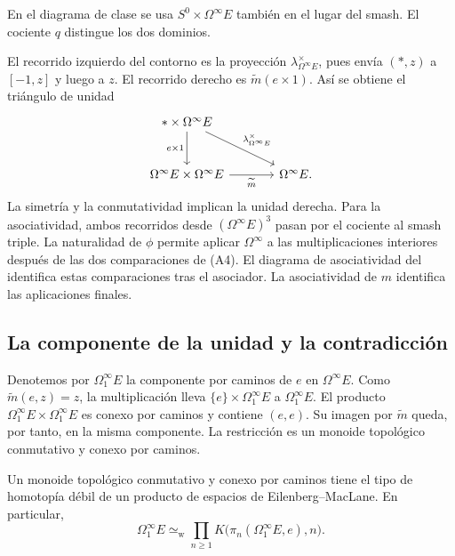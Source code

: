 \begin{nota}
En el diagrama de clase se usa $S^0\times\Omega^\infty E$ también en el lugar del smash. El cociente $q$ distingue los dos dominios.
\end{nota}
El recorrido izquierdo del contorno es la proyección $\lambda^\times_{\Omega^\infty E}$, pues envía $(*,z)$ a $[-1,z]$ y luego a $z$. El recorrido derecho es $\widetilde m(e\times1)$. Así se obtiene el triángulo de unidad
\[
\begin{tikzcd}[column sep=large,row sep=large]
*\times\Omega^\infty E\arrow[d,"e\times1"']\arrow[dr,"\lambda^\times_{\Omega^\infty E}"]&\\
\Omega^\infty E\times\Omega^\infty E\arrow[r,"\widetilde m"']&\Omega^\infty E .
\end{tikzcd}
\]
La simetría y la conmutatividad implican la unidad derecha. Para la asociatividad, ambos recorridos desde $(\Omega^\infty E)^3$ pasan por el cociente al smash triple. La naturalidad de $\phi$ permite aplicar $\Omega^\infty$ a las multiplicaciones interiores después de las dos comparaciones de (A4). El diagrama de asociatividad del  identifica estas comparaciones tras el asociador. La asociatividad de $m$ identifica las aplicaciones finales.

\subsection{La componente de la unidad y la contradicción}

Denotemos por $\Omega^\infty_1 E$ la componente por caminos de $e$ en $\Omega^\infty E$. Como $\widetilde m(e,z)=z$, la multiplicación lleva $\{e\}\times\Omega^\infty_1 E$ a $\Omega^\infty_1 E$. El producto $\Omega^\infty_1 E\times\Omega^\infty_1 E$ es conexo por caminos y contiene $(e,e)$. Su imagen por $\widetilde m$ queda, por tanto, en la misma componente. La restricción es un monoide topológico conmutativo y conexo por caminos.

\begin{teo}\label{teo:c26-monoide-may}
Un monoide topológico conmutativo y conexo por caminos tiene el tipo de homotopía débil de un producto de espacios de Eilenberg--MacLane. En particular,
\[
\Omega^\infty_1 E\simeq_{\mathrm w}
\prod_{n\geq1} K\bigl(\pi_n(\Omega^\infty_1 E,e),n\bigr).
\]
\end{teo}

